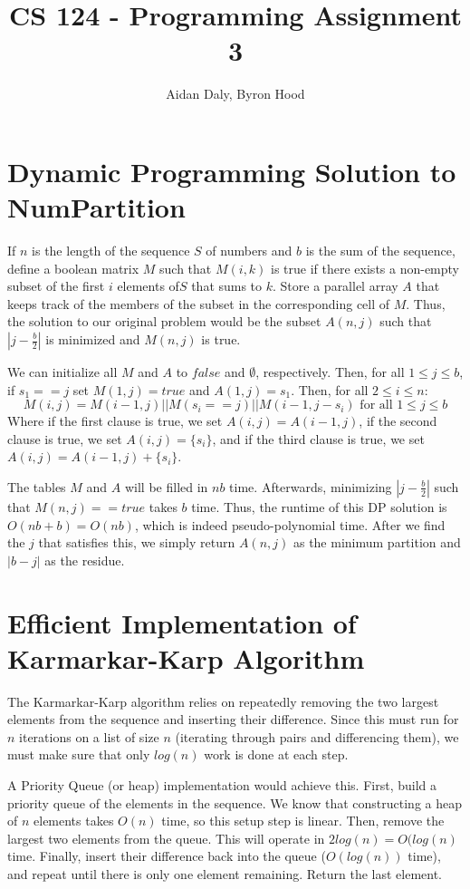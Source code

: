 \documentclass[11pt]{article}
\title{CS 124 - Programming Assignment 3}
\author{Aidan Daly, Byron Hood}
\begin{document}
\maketitle

\section{Dynamic Programming Solution to NumPartition}
If $n$ is the length of the sequence $S$ of numbers and $b$ is the sum of the sequence, define a boolean matrix $M$ such that $M(i,k)$ is true if there exists a non-empty subset of the first $i$ elements of$S$ that sums to $k$.  Store a parallel array $A$ that keeps track of the members of the subset in the corresponding cell of $M$.  Thus, the solution to our original problem would be the subset $A(n,j)$ such that $|j-\frac{b}{2}|$ is minimized and $M(n,j)$ is true.

We can initialize all $M$ and $A$ to $false$ and $\emptyset$, respectively.  Then, for all $1\leq j \leq b$, if $s_1 == j$ set $M(1,j) = true$ and $A(1,j) = s_1$.  Then, for all $2 \leq i \leq n$:
\begin{equation}
M(i,j) = M(i-1,j) || M(s_i == j) || M(i-1,j-s_i) \mbox{ for all } 1 \leq j \leq b
\end{equation}
Where if the first clause is true, we set $A(i,j) = A(i-1,j)$, if the second clause is true, we set $A(i,j) = \{s_i\}$, and if the third clause is true, we set $A(i,j) = A(i-1,j)+\{s_i\}$.

The tables $M$ and $A$ will be filled in $nb$ time.  Afterwards, minimizing $|j-\frac{b}{2}|$ such that $M(n,j) == true$ takes $b$ time.  Thus, the runtime of this DP solution is $O(nb+b) = O(nb)$, which is indeed pseudo-polynomial time.  After we find the $j$ that satisfies this, we simply return $A(n,j)$ as the minimum partition and $|b-j|$ as the residue.

\section{Efficient Implementation of Karmarkar-Karp Algorithm}
The Karmarkar-Karp algorithm relies on repeatedly removing the two largest elements from the sequence and inserting their difference.  Since this must run for $n$ iterations on a list of size $n$ (iterating through pairs and differencing them), we must make sure that only $log(n)$ work is done at each step.

A Priority Queue (or heap) implementation would achieve this.  First, build a priority queue of the elements in the sequence.  We know that constructing a heap of $n$ elements takes $O(n)$ time, so this setup step is linear.  Then, remove the largest two elements from the queue.  This will operate in $2log(n) = O(log(n)$ time.  Finally, insert their difference back into the queue ($O(log(n))$ time), and repeat until there is only one element remaining.  Return the last element. 
\end{document}
